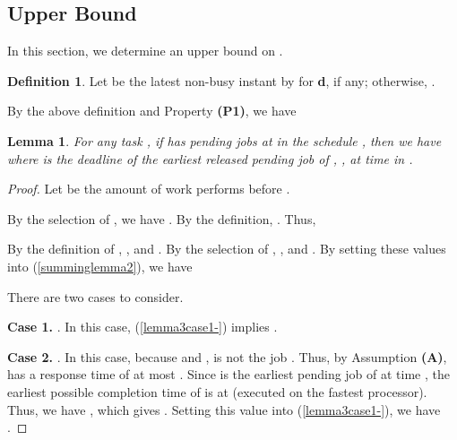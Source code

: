 \documentclass[Times, 10pt,twocolumn]{article}
\newtheorem{lemma}{\textbf{Lemma}}
\theoremstyle{definition}
\newtheorem{definition}{\textbf{Definition}}
\begin{document}
\subsection{Upper Bound}
\label{sec:upper_bound}

In this section, we determine an upper bound on .

\begin{definition}
Let  be the latest non-busy instant by  for \textbf{d}, if any; otherwise, .
\end{definition}

By the above definition and Property \textbf{(P1)}, we have 


\begin{lemma}
\label{lemma:Upper_lemma1}
For any task , if  has pending jobs at  in the schedule , then we have
\small
 \normalsize
where  is the deadline of the earliest released pending job of , , at time  in . 
\end{lemma}

\begin{proof}
Let be the amount of work  performs before .

By the selection of , we have . By the definition, . Thus,


By the definition of , , and . By the selection of , , and . By setting these values into (\ref{summinglemma2}), we have


There are two cases to consider.

\vspace{1mm}
\textbf{Case 1.} .
In this case, (\ref{lemma3case1-}) implies .

\vspace{2mm}
\textbf{Case 2.} . In this case, because  and ,  is not the job . Thus, by Assumption \textbf{(A)},  has a response time of at most . Since  is the earliest pending job of  at time , the earliest possible completion time of  is at  (executed on the fastest processor). Thus, we have , which gives . Setting this value into (\ref{lemma3case1-}), we have .
\end{proof}
\end{document}
